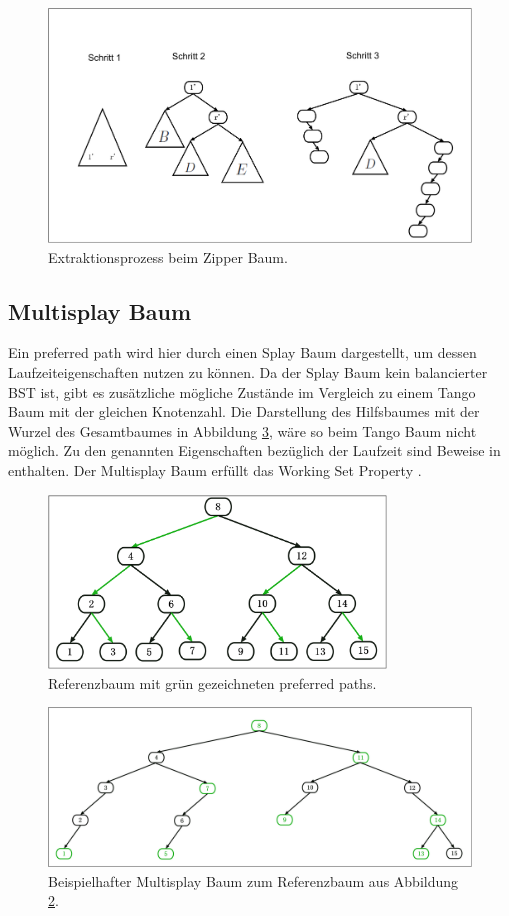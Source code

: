 \documentclass[a4paper,12pt]{article}
\begin{document}
\begin{figure}[H]
	\centering
	\includegraphics[height= 0.5\textwidth]{Medien/Zipper/hybrid/extractHybrid}
	\caption{Extraktionsprozess beim Zipper Baum. }
	\label{fig:extractHybrid}
\end{figure}
\subsection{Multisplay Baum}
Ein preferred path wird hier durch einen Splay Baum dargestellt, um dessen Laufzeiteigenschaften nutzen zu können. Da der Splay Baum kein balancierter BST ist, gibt es zusätzliche mögliche Zustände im Vergleich zu einem Tango Baum mit der gleichen Knotenzahl. Die Darstellung des Hilfsbaumes mit der Wurzel des Gesamtbaumes in Abbildung \ref{fig:pfadRepresentation}, wäre so beim Tango Baum nicht möglich. Zu den genannten Eigenschaften bezüglich der Laufzeit sind Beweise in \cite{multisplay} enthalten. Der Multisplay Baum erfüllt das Working Set Property \cite{porpMultiSplay}. 
\begin{figure}[H]
	\centering
	\includegraphics[width= 0.8\textwidth]{Medien/Multisplay/referenzTree}
	\caption {Referenzbaum mit grün gezeichneten preferred paths. }
	\label{fig:referenzTree}
\end{figure} 
\begin{figure}[H]
	\centering
	\includegraphics[width= 1\textwidth]{Medien/Multisplay/pfadRepresentation}
	\caption {Beispielhafter Multisplay Baum zum Referenzbaum aus Abbildung \ref{fig:referenzTree}.}
	\label{fig:pfadRepresentation}
\end{figure} 
\end{document}
